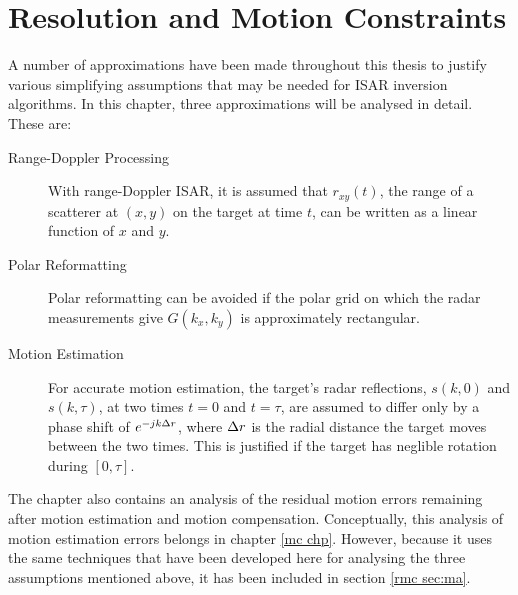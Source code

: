 %
%
%
%
%
%
%

\chapter{Resolution and Motion Constraints}
\label{rmc chp}

\bigletter A number of approximations have been made throughout this thesis
to justify various simplifying assumptions that may be needed for ISAR
inversion algorithms.  In this chapter, three approximations will be
analysed in detail.  These are:

\begin{description}
\item[Range-Doppler Processing] With range-Doppler ISAR, it is assumed that
$r_{xy}(t)$, the range of a scatterer at $(x,y)$ on the target at time $t$, 
can be written as a linear function of $x$ and $y$.

\item[Polar Reformatting] Polar reformatting can be avoided if the polar
grid on which the radar measurements give $G(k_x,k_y)$ is approximately
rectangular.  

\item[Motion Estimation] For accurate motion estimation, the target's radar 
reflections, $s(k,0)$ and
$s(k,\tau)$, at two times $t=0$ and $t=\tau$, are assumed to differ only by a
phase shift of $e^{-jk{\Delta r}}$, where ${\Delta r}$ is the radial distance the target
moves between the two times.  This is justified if the target has neglible
rotation during $[0,\tau]$.
\end{description}

The chapter also contains an analysis of the residual motion
errors remaining after motion estimation and motion compensation. 
Conceptually, this analysis of motion estimation errors belongs in 
chapter \ref{mc chp}.  However, because it uses the same techniques that
have been developed here for analysing the three assumptions
mentioned above, it has been included in section \ref{rmc sec:ma}.

